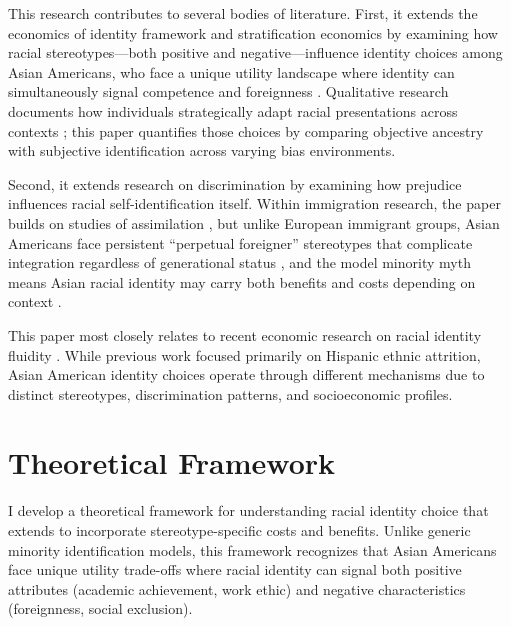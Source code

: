 This research contributes to several bodies of literature. First, it extends the economics of identity framework \autocite{akerlofEconomicsIdentity2000} and stratification economics \autocite{darityEconomicsIdentityOrigin2006,darityPositionPossessionsStratification2022} by examining how racial stereotypes---both positive and negative---influence identity choices among Asian Americans, who face a unique utility landscape where identity can simultaneously signal competence and foreignness \autocite{charnessSocialIdentityGroup2020,atkinHowWeChoose2021,goldsmithDarkLightSkin2007,hamiltonSheddingLightMarriage2009,dietteSkinShadeStratification2015}. Qualitative research documents how individuals strategically adapt racial presentations across contexts \autocite{waters1990ethnic,telles2008generations,zhou1997segmented,cornell2006ethnicity}; this paper quantifies those choices by comparing objective ancestry with subjective identification across varying bias environments.

Second, it extends research on discrimination \autocite{bertrandAreEmilyGreg2004,charlesPrejudiceWagesEmpirical2008,bursztynImmigrantNextDoor2022,bordaloStereotypes2016} by examining how prejudice influences racial self-identification itself. Within immigration research, the paper builds on studies of assimilation \autocite{abramitzkyCulturalAssimilationAge2016,abramitzkyNationImmigrantsAssimilation2014}, but unlike European immigrant groups, Asian Americans face persistent ``perpetual foreigner'' stereotypes that complicate integration regardless of generational status \autocite{foukaImmigrantsAmericansRace2022}, and the model minority myth means Asian racial identity may carry both benefits and costs depending on context \autocite{mengIntermarriageEconomicAssimilation2005}.

This paper most closely relates to recent economic research on racial identity fluidity \autocite{hadah2024hispanicidentity, antmanEthnicAttritionObserved2016,antmanIncentivesIdentifyRacial2015,antmanAmericanIndianCasinos2021}. While previous work focused primarily on Hispanic ethnic attrition, Asian American identity choices operate through different mechanisms due to distinct stereotypes, discrimination patterns, and socioeconomic profiles.

\section{Theoretical Framework}\label{sec:model}

I develop a theoretical framework for understanding racial identity choice that extends \textcite{akerlofEconomicsIdentity2000} to incorporate stereotype-specific costs and benefits. Unlike generic minority identification models, this framework recognizes that Asian Americans face unique utility trade-offs where racial identity can signal both positive attributes (academic achievement, work ethic) and negative characteristics (foreignness, social exclusion).

